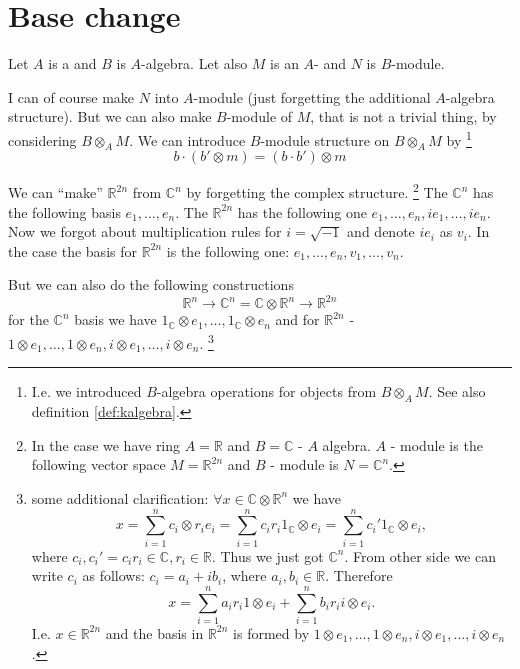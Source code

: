 \section{Base change}

Let $A$ is a  and $B$ is $A$-algebra. Let also $M$
is an $A$- and $N$ is $B$-module.

I can of course make $N$ into $A$-module (just forgetting the
additional $A$-algebra structure). But we can also make $B$-module of
$M$, that is not a trivial thing, by considering $B \otimes_A M$.
We can introduce $B$-module structure on $B \otimes_A M$ by
\footnote{
  I.e. we introduced $B$-algebra operations for objects from
  $B \otimes_A M$. See also definition \ref{def:kalgebra}.
}
\[
b \cdot \left(b' \otimes m \right) = \left( b \cdot b' \right) \otimes m 
\]

\begin{example}
  We can ``make'' $\mathbb{R}^{2n}$ from $\mathbb{C}^n$ by forgetting
  the complex structure.
  \footnote{
    In the case we have ring $A = \mathbb{R}$ and $B = \mathbb{C}$ -
    $A$ algebra. $A$ - module is the following vector space
    $M = \mathbb{R}^{2n}$ and $B$ - module is $N = \mathbb{C}^n$.
  }
  The $\mathbb{C}^n$ has the following basis $e_1, \dots, e_n$.
  The $\mathbb{R}^{2n}$ has the following one
  $e_1, \dots, e_n, i e_1, \dots, i e_n$. Now we forgot about
  multiplication rules for $i = \sqrt{-1}$ and denote $i e_i$ as
  $v_i$. In the case the basis for $\mathbb{R}^{2n}$ is the following
  one: $e_1, \dots, e_n, v_1, \dots, v_n$.

  But we can also do the following constructions
  \[
  \mathbb{R}^n \rightarrow
  \mathbb{C}^n = \mathbb{C} \otimes \mathbb{R}^n \rightarrow
  \mathbb{R}^{2n}
  \]
  for the $\mathbb{C}^n$ basis we have
  $1_{\mathbb{C}} \otimes e_1, \dots, 1_{\mathbb{C}} \otimes e_n$ and
  for
  $\mathbb{R}^{2n}$ -
  $1 \otimes e_1, \dots, 1 \otimes e_n, i \otimes e_1, \dots, i
  \otimes e_n$.
  \footnote{
    some additional clarification:
    $\forall x \in \mathbb{C} \otimes \mathbb{R}^n$ we have
    \[
    x = \sum_{i=1}^n c_i \otimes r_i e_i =
    \sum_{i=1}^n c_i r_i 1_{\mathbb{C}} \otimes e_i =
    \sum_{i=1}^n c_i' 1_{\mathbb{C}} \otimes e_i,
    \]
    where $c_i,c_i'=c_i r_i \in \mathbb{C}, r_i \in \mathbb{R}$. Thus
    we just got $\mathbb{C}^n$. 
    From other side we can write $c_i$
    as follows: $c_i = a_i + i b_i$, where $a_i, b_i \in \mathbb{R}$.
    Therefore
    \[
    x = \sum_{i=1}^n a_i r_i 1 \otimes e_i + \sum_{i=1}^n b_i r_i i \otimes e_i.
    \]
    I.e. $x \in \mathbb{R}^{2n}$ and the basis in $\mathbb{R}^{2n}$ is
    formed by $1 \otimes e_1, \dots, 1 \otimes e_n, i \otimes e_1,
    \dots, i \otimes e_n$.
  }

\end{example}

